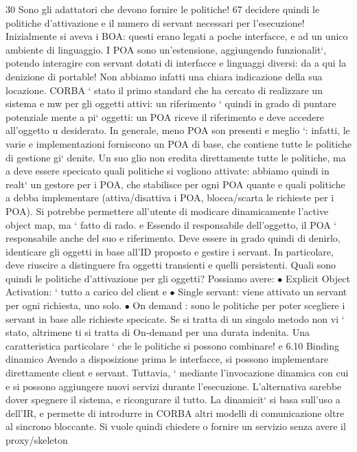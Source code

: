 \documentclass[a4paper,12pt]{article}
\begin{document}
30 Sono
gli adattatori che devono fornire le politiche!
67
decidere quindi le politiche d'attivazione e il numero di servant necessari per
l'esecuzione!
Inizialmente si aveva i BOA: questi erano legati a poche interfacce, e ad un
unico ambiente di linguaggio. I POA sono un'estensione, aggiungendo funzionalit`, potendo interagire con servant dotati
di interfacce e linguaggi diversi: da
a
qui la denizione di portable! Non abbiamo infatti una chiara indicazione della
sua locazione.
CORBA ` stato il primo standard che ha cercato di realizzare un sistema
e
mw per gli oggetti attivi: un riferimento ` quindi in grado di puntare potenziale
mente a pi` oggetti: un POA riceve il riferimento e deve accedere all'oggetto
u
desiderato. In generale, meno POA son presenti e meglio `: infatti, le varie
e
implementazioni forniscono un POA di base, che contiene tutte le politiche di
gestione gi` denite. Un suo glio non eredita direttamente tutte le politiche, ma
a
deve essere specicato quali politiche si vogliono attivate: abbiamo quindi in realt` un gestore per i POA, che
stabilisce per ogni POA quante e quali politiche
a
debba implementare (attiva/disattiva i POA, blocca/scarta le richieste per i
POA). Si potrebbe permettere all'utente di modicare dinamicamente l'active
object map, ma ` fatto di rado.
e
Essendo il responsabile dell'oggetto, il POA ` responsabile anche del suo
e
riferimento. Deve essere in grado quindi di denirlo, identicare gli oggetti in
base all'ID proposto e gestire i servant. In particolare, deve riuscire a distinguere
fra oggetti transienti e quelli persistenti.
Quali sono quindi le politiche d'attivazione per gli oggetti? Possiamo avere:
$\bullet$ Explicit Object Activation: ` tutto a carico del client
e
$\bullet$ Single servant: viene attivato un servant per ogni richiesta, uno solo.
$\bullet$ On demand : sono le politiche per poter scegliere i servant in base alle richieste specicate. Se si tratta di
un singolo metodo non vi ` stato, altrimene
ti si tratta di On-demand per una durata indenita. Una caratteristica
particolare ` che le politiche si possono combinare!
e
6.10
Binding dinamico
Avendo a disposizione prima le interfacce, si possono implementare direttamente client e servant. Tuttavia, ` mediante
l'invocazione dinamica con cui
e
si possono aggiungere nuovi servizi durante l'esecuzione. L'alternativa sarebbe
dover spegnere il sistema, e ricongurare il tutto. La dinamicit` si basa sull'uso
a
dell'IR, e permette di introdurre in CORBA altri modelli di comunicazione oltre
al sincrono bloccante.
Si vuole quindi chiedere o fornire un servizio senza avere il proxy/skeleton
\end{document}
